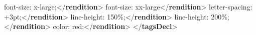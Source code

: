 \begin{shaded}
font-size: x-large;{</\textbf{rendition}>}\mbox{}\newline 
{}font-size: xx-large{</\textbf{rendition}>}\mbox{}\newline 
{}letter-spacing: +3pt;{</\textbf{rendition}>}\mbox{}\newline 
{}line-height: 150\%;{</\textbf{rendition}>}\mbox{}\newline 
{}line-height: 200\%;{</\textbf{rendition}>}\mbox{}\newline 
{}color: red;{</\textbf{rendition}>}\mbox{}\newline 
{</\textbf{tagsDecl}>}\end{shaded}\egroup\par \par
